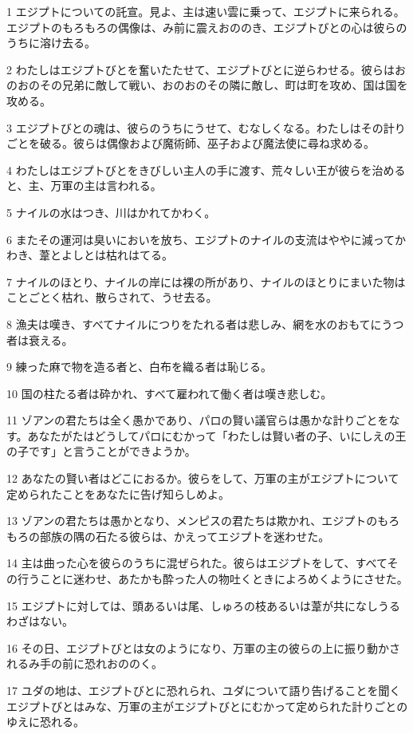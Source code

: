 \par 1 エジプトについての託宣。見よ、主は速い雲に乗って、エジプトに来られる。エジプトのもろもろの偶像は、み前に震えおののき、エジプトびとの心は彼らのうちに溶け去る。
\par 2 わたしはエジプトびとを奮いたたせて、エジプトびとに逆らわせる。彼らはおのおのその兄弟に敵して戦い、おのおのその隣に敵し、町は町を攻め、国は国を攻める。
\par 3 エジプトびとの魂は、彼らのうちにうせて、むなしくなる。わたしはその計りごとを破る。彼らは偶像および魔術師、巫子および魔法使に尋ね求める。
\par 4 わたしはエジプトびとをきびしい主人の手に渡す、荒々しい王が彼らを治めると、主、万軍の主は言われる。
\par 5 ナイルの水はつき、川はかれてかわく。
\par 6 またその運河は臭いにおいを放ち、エジプトのナイルの支流はややに減ってかわき、葦とよしとは枯れはてる。
\par 7 ナイルのほとり、ナイルの岸には裸の所があり、ナイルのほとりにまいた物はことごとく枯れ、散らされて、うせ去る。
\par 8 漁夫は嘆き、すべてナイルにつりをたれる者は悲しみ、網を水のおもてにうつ者は衰える。
\par 9 練った麻で物を造る者と、白布を織る者は恥じる。
\par 10 国の柱たる者は砕かれ、すべて雇われて働く者は嘆き悲しむ。
\par 11 ゾアンの君たちは全く愚かであり、パロの賢い議官らは愚かな計りごとをなす。あなたがたはどうしてパロにむかって「わたしは賢い者の子、いにしえの王の子です」と言うことができようか。
\par 12 あなたの賢い者はどこにおるか。彼らをして、万軍の主がエジプトについて定められたことをあなたに告げ知らしめよ。
\par 13 ゾアンの君たちは愚かとなり、メンピスの君たちは欺かれ、エジプトのもろもろの部族の隅の石たる彼らは、かえってエジプトを迷わせた。
\par 14 主は曲った心を彼らのうちに混ぜられた。彼らはエジプトをして、すべてその行うことに迷わせ、あたかも酔った人の物吐くときによろめくようにさせた。
\par 15 エジプトに対しては、頭あるいは尾、しゅろの枝あるいは葦が共になしうるわざはない。
\par 16 その日、エジプトびとは女のようになり、万軍の主の彼らの上に振り動かされるみ手の前に恐れおののく。
\par 17 ユダの地は、エジプトびとに恐れられ、ユダについて語り告げることを聞くエジプトびとはみな、万軍の主がエジプトびとにむかって定められた計りごとのゆえに恐れる。
